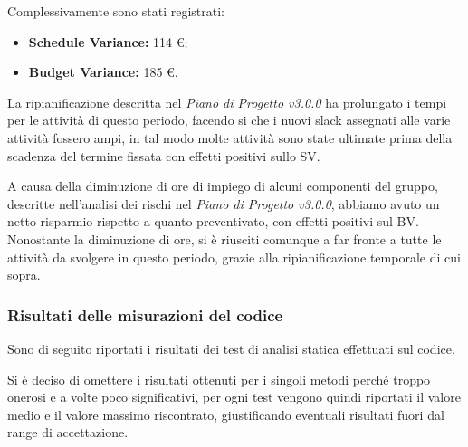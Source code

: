 \noindent Complessivamente sono stati registrati:
\begin{itemize}
	\item \textbf{Schedule Variance:} 114 \euro;
	\item \textbf{Budget Variance:} 185 \euro.
\end{itemize}

\noindent La ripianificazione descritta nel \textit{Piano di Progetto v3.0.0} ha prolungato i tempi per le attività di questo periodo, facendo si che i nuovi \gls{slack} assegnati alle varie attività fossero ampi, in tal modo molte attività sono state ultimate prima della scadenza del termine fissata con effetti positivi sullo SV.

\noindent A causa della diminuzione di ore di impiego di alcuni componenti del gruppo, descritte nell'analisi dei rischi nel \textit{Piano di Progetto v3.0.0}, abbiamo avuto un netto risparmio rispetto a quanto preventivato, con effetti positivi sul BV. Nonostante la diminuzione di ore, si è riusciti comunque a far fronte a tutte le attività da svolgere in questo periodo, grazie alla ripianificazione temporale di cui sopra.  

\subsubsection{Risultati delle misurazioni del codice}
\label{appendice 7}
\vspace{3mm}

Sono di seguito riportati i risultati dei test di analisi statica effettuati sul codice.

Si è deciso di omettere i risultati ottenuti per i singoli metodi perché troppo onerosi e a volte poco significativi, per ogni test vengono quindi riportati il valore medio e il valore massimo riscontrato, giustificando eventuali risultati fuori dal range di accettazione.

